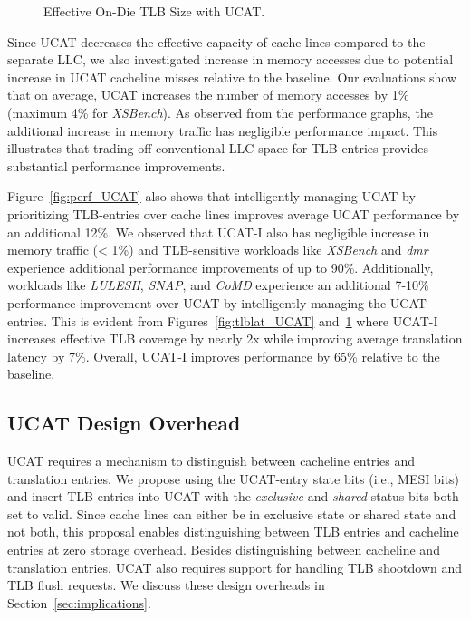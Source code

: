 \begin{figure}[b]
  \vspace{0.2in} \centering
  \centerline{}

  \caption{\small Effective On-Die TLB Size with UCAT.\normalsize}
  \label{fig:tlbsize_UCAT} 
  \vspace{-0.0 in}
\end{figure}

Since UCAT decreases the effective capacity of cache lines compared to
the separate LLC, we also investigated increase in memory accesses due
to potential increase in UCAT cacheline misses relative to the
baseline. Our evaluations show that on average, UCAT increases the
number of memory accesses by 1\% (maximum 4\% for {\em XSBench}). As
observed from the performance graphs, the additional increase in
memory traffic has negligible performance impact. This illustrates
that trading off conventional LLC space for TLB entries provides
substantial performance improvements.

Figure~\ref{fig:perf_UCAT} also shows that intelligently managing UCAT
by prioritizing TLB-entries over cache lines improves average UCAT
performance by an additional 12\%. We observed that UCAT-I also has
negligible increase in memory traffic (< 1\%) and TLB-sensitive
workloads like {\em XSBench} and {\em dmr} experience additional
performance improvements of up to 90\%. Additionally, workloads like
{\em LULESH}, {\em SNAP}, and {\em CoMD} experience an additional
7-10\% performance improvement over UCAT by intelligently managing the
UCAT-entries. This is evident from Figures~\ref{fig:tlblat_UCAT}
and~\ref{fig:tlbsize_UCAT} where UCAT-I increases effective TLB
coverage by nearly 2x while improving average translation latency by
7\%. Overall, UCAT-I improves performance by 65\% relative to the
baseline.

\subsection{UCAT Design Overhead}

\noindent UCAT requires a mechanism to distinguish between cacheline
entries and translation entries. We propose using the UCAT-entry state
bits (i.e., MESI bits) and insert TLB-entries into UCAT with the {\em
exclusive} and {\em shared} status bits both set to valid. Since
cache lines can either be in exclusive state or shared state and not
both, this proposal enables distinguishing between TLB entries and
cacheline entries at zero storage overhead. Besides distinguishing
between cacheline and translation entries, UCAT also requires support
for handling TLB shootdown and TLB flush requests. We discuss these
design overheads in Section~\ref{sec:implications}.


